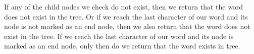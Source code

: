 \documentclass[addpoints,12pt,answers]{exam}
\begin{document}
\begin{questions}
If any of the child nodes we check do not exist, then we return that the word does not exist in the tree. Or if we reach the last character of our word and its node is not marked as 
an end node, then we also return that the word does not exist in the tree. If we reach the last character of our word and its node is marked as an end node, only then do we return 
that the word exists in tree.
\end{questions}
\end{document}

